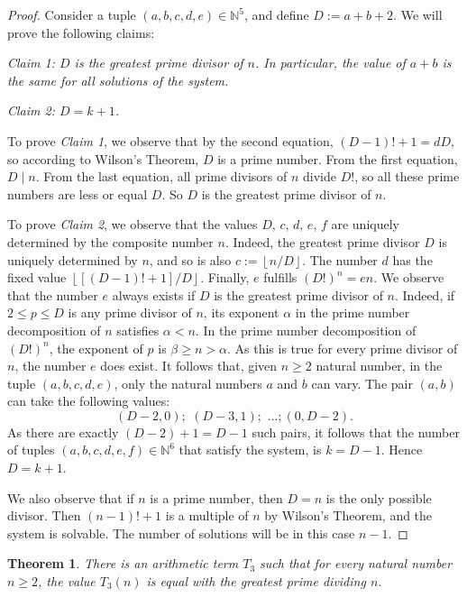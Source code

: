 \documentclass[10pt]{article}
\theoremstyle{plain}
\newtheorem{theorem}{Theorem}[section]
\newcommand{\floor}[1]{\left\lfloor #1 \right\rfloor}
\begin{document}
\begin{proof}

 Consider a tuple $(a,b,c,d,e) \in \mathbb N^5$, and define $D:= a+b+2$. We will prove the following claims:

    {\it Claim 1: $D$ is the greatest prime divisor of $n$. In particular, the value of $a+b$ is the same for all solutions of the system.}

    {\it Claim 2: $D = k+1$. }

    To prove {\it Claim 1}, we observe that by the second equation, $(D-1)! + 1 = dD$, so according to Wilson's Theorem, $D$ is a prime number. From the first equation, $D \mid n$. From the last equation, all prime divisors of $n$ divide $D!$, so all these prime numbers are less or equal $D$. So $D$ is the greatest prime divisor of $n$.

    To prove {\it Claim 2}, we observe that the values $D$, $c$, $d$, $e$, $f$ are uniquely determined by the composite number $n$. Indeed, the greatest prime divisor $D$ is uniquely determined by $n$, and so is also $c := \floor{n/D}$. The number $d$ has the fixed value $\floor{[(D-1)! + 1] / D}$. Finally, $e$ fulfills $ (D!)^n = e n$. We observe that the number $e$ always exists if $D$ is the greatest prime divisor of $n$. Indeed, if $2 \leq p \leq D$ is any prime divisor of $n$, its exponent $\alpha$ in the prime number decomposition of $n$ satisfies $\alpha < n$. In the prime number decomposition of $(D!)^n$, the exponent of $p$ is $\beta \geq n > \alpha$. As this is true for every prime divisor of $n$, the number $e$ does exist.   It follows that, given $n \geq 2$ natural number, in the tuple $(a, b, c, d, e)$, only the natural numbers $a$ and $b$ can vary. The pair $(a,b)$ can take the following values:
    $$(D-2, 0); \,\,(D-3, 1); \,\, \dots; (0, D-2).$$
    As there are exactly $(D-2) + 1 = D-1$ such pairs, it follows that the number of tuples $(a, b, c, d, e, f) \in \mathbb N^6$ that satisfy the system, is $k = D-1$. Hence $D=k+1$.

    We also observe that if $n$ is a prime number, then $D = n$ is the only possible divisor. Then $(n-1)!+1$ is a multiple of $n$ by Wilson's Theorem, and the system is solvable. The number of solutions will be in this case $n-1$.
\end{proof}

\begin{theorem}\label{theorembiggestprimedivisor}
        There is an arithmetic term $T_3$ such that for every natural number $n \geq 2$, the value $T_3(n)$ is equal with the greatest prime dividing $n$.
\end{theorem}
\end{document}
